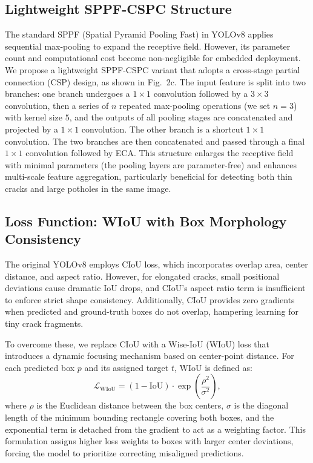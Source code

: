\documentclass[twocolumn]{sn-jnl}
\begin{document}
	\subsection{Lightweight SPPF-CSPC Structure}
	The standard SPPF (Spatial Pyramid Pooling Fast) in YOLOv8 applies sequential max-pooling to expand the receptive field. However, its parameter count and computational cost become non-negligible for embedded deployment. We propose a lightweight SPPF-CSPC variant that adopts a cross-stage partial connection (CSP) design, as shown in Fig.~2c. The input feature is split into two branches: one branch undergoes a \(1\times1\) convolution followed by a \(3\times3\) convolution, then a series of \(n\) repeated max-pooling operations (we set \(n=3\)) with kernel size \(5\), and the outputs of all pooling stages are concatenated and projected by a \(1\times1\) convolution. The other branch is a shortcut \(1\times1\) convolution. The two branches are then concatenated and passed through a final \(1\times1\) convolution followed by ECA. This structure enlarges the receptive field with minimal parameters (the pooling layers are parameter-free) and enhances multi-scale feature aggregation, particularly beneficial for detecting both thin cracks and large potholes in the same image.
	
	\subsection{Loss Function: WIoU with Box Morphology Consistency}
	The original YOLOv8 employs CIoU loss, which incorporates overlap area, center distance, and aspect ratio. However, for elongated cracks, small positional deviations cause dramatic IoU drops, and CIoU's aspect ratio term is insufficient to enforce strict shape consistency. Additionally, CIoU provides zero gradients when predicted and ground-truth boxes do not overlap, hampering learning for tiny crack fragments.
	
	To overcome these, we replace CIoU with a Wise-IoU (WIoU) loss \cite{Sui2022} that introduces a dynamic focusing mechanism based on center-point distance. For each predicted box \(p\) and its assigned target \(t\), WIoU is defined as:
	\[
	\mathcal{L}_{\text{WIoU}} = (1 - \text{IoU}) \cdot \exp\left( \frac{\rho^2}{\sigma^2} \right),
	\]
	where \(\rho\) is the Euclidean distance between the box centers, \(\sigma\) is the diagonal length of the minimum bounding rectangle covering both boxes, and the exponential term is detached from the gradient to act as a weighting factor. This formulation assigns higher loss weights to boxes with larger center deviations, forcing the model to prioritize correcting misaligned predictions.
	
\end{document}
